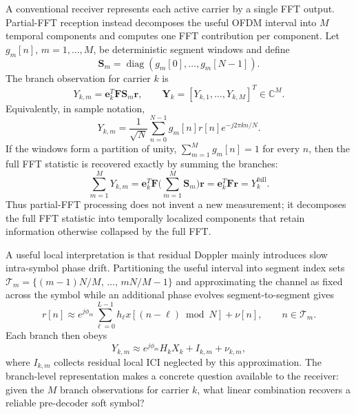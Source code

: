 \documentclass{wileysev}
\newcommand{\C}{\mathbb{C}}
\begin{document}
	A conventional receiver represents each active carrier by a single FFT output. Partial-FFT reception instead decomposes the useful OFDM interval into \(M\) temporal components and computes one FFT contribution per component. Let \(g_m[n]\), \(m=1,\dots,M\), be deterministic segment windows and define
	\[
	\mathbf S_m=\operatorname{diag}(g_m[0],\dots,g_m[N-1]).
	\]
	The branch observation for carrier \(k\) is
	\begin{equation}
		Y_{k,m}=\mathbf e_k^{T}\mathbf F\mathbf S_m\mathbf r,
		\qquad
		\mathbf Y_k=[Y_{k,1},\dots,Y_{k,M}]^{T}\in\C^M .
		\label{eq:partial_fft_operator}
	\end{equation}
	Equivalently, in sample notation,
	\begin{equation}
		Y_{k,m}
		=
		\frac{1}{\sqrt{N}}
		\sum_{n=0}^{N-1}
		g_m[n] r[n] e^{-j2\pi kn/N}.
		\label{eq:partial_fft_branch}
	\end{equation}
	If the windows form a partition of unity, \(\sum_{m=1}^{M}g_m[n]=1\) for every \(n\), then the full FFT statistic is recovered exactly by summing the branches:
	\begin{equation}
		\sum_{m=1}^{M}Y_{k,m}
		=\mathbf e_k^{T}\mathbf F\Big(\sum_{m=1}^{M}\mathbf S_m\Big)\mathbf r
		=\mathbf e_k^{T}\mathbf F\mathbf r
		=Y_k^{\mathrm{full}} .
		\label{eq:branch_sum_identity}
	\end{equation}
	Thus partial-FFT processing does not invent a new measurement; it decomposes the full FFT statistic into temporally localized components that retain information otherwise collapsed by the full FFT.
	
	A useful local interpretation is that residual Doppler mainly introduces slow intra-symbol phase drift. Partitioning the useful interval into segment index sets \(\mathcal{T}_m = \{(m-1)N/M,\,\dots,\,mN/M-1\}\) and approximating the channel as fixed across the symbol while an additional phase evolves segment-to-segment gives
	\begin{equation}
		r[n]
		\approx
		e^{j\phi_m}
		\sum_{\ell=0}^{L-1}h_\ell x[(n-\ell)\bmod N]+\nu[n],
		\qquad n\in\mathcal T_m.
		\label{eq:piecewise_phase_rotation}
	\end{equation}
	Each branch then obeys
	\begin{equation}
		Y_{k,m}
		\approx
		e^{j\phi_m}H_kX_k + I_{k,m}+\nu_{k,m},
		\label{eq:branch_local_phase_model}
	\end{equation}
	where \(I_{k,m}\) collects residual local ICI neglected by this approximation. The branch-level representation makes a concrete question available to the receiver: given the \(M\) branch observations for carrier \(k\), what linear combination recovers a reliable pre-decoder soft symbol?
	
\end{document}
